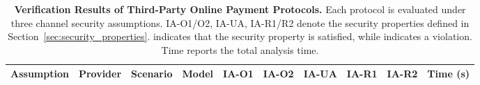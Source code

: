 
\begin{table}[t]
\centering
\small
\setlength{\tabcolsep}{6pt}
\renewcommand{\arraystretch}{1.15}

\caption{
      \textbf{Verification Results of Third-Party Online Payment Protocols.}
      Each protocol is evaluated under three channel security assumptions. 
      IA-O1/O2, IA-UA, IA-R1/R2 denote the security properties defined in Section~\ref{sec:security_properties}.
      \textcolor{xgreen}{} indicates that the security property is satisfied, while \textcolor{xred}{} indicates a violation.
      Time reports the total analysis time.
    }
\label{tab:lemma-results}

\begin{tabularx}{\textwidth}{XXXXcccccr}
\toprule

\textbf{Assumption} & \textbf{Provider} & \textbf{Scenario} & \textbf{Model} & \textbf{\; IA-O1 \;} & \textbf{\; IA-O2 \;} & \textbf{\; IA-UA \;} & \textbf{\; IA-R1 \;} & \textbf{\; IA-R2 \;} & \textbf{Time (s)}\\

\midrule


\end{tabularx}
\end{table}
